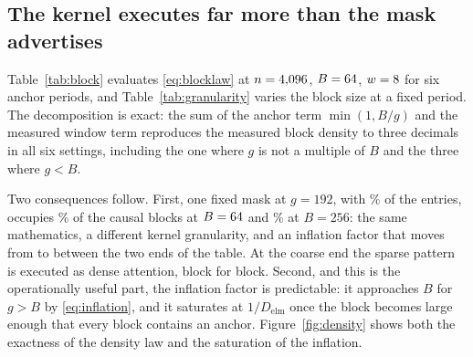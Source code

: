 \subsection{The kernel executes far more than the mask advertises}\label{sec:granularity}

Table~\ref{tab:block} evaluates \eqref{eq:blocklaw} at $n=\AlignN$,
$B=\AlignBlock$, $w=\AlignW$ for six anchor periods, and
Table~\ref{tab:granularity} varies the block size at a fixed period. The
decomposition is exact: the sum of the anchor term $\min(1,B/g)$ and the measured
window term reproduces the measured block density to three decimals in all six
settings, including the one where $g$ is not a multiple of $B$ and the three where
$g<B$.

\begin{table}[t]
\centering

\caption{Granularity law \eqref{eq:blocklaw} at $n=\AlignN$, $B=\AlignBlock$,
$w=\AlignW$. The anchor term is $\min(1,B/g)$; the window term is measured; their
sum reproduces the measured block density exactly. Alignment between $g$ and $B$
does not enter the count; the ratio of executed to element density ranges from
\BlockInflationMin{} to \BlockInflationMax{} across the six periods. Data:
\texttt{s1\_pswa/block\_alignment.json}.}
\label{tab:block}
\end{table}

\begin{table}[t]
\centering

\caption{Inflation of executed density over element density as the block size
grows at fixed period $g=192$, $n=\AlignN$, $w=\AlignW$. ``Block pairs'' is the
fraction of all block pairs the kernel materialises, ``causal blocks'' the same
count over the causal ones, and ``elements'' the fraction of the $n^2$ scores the
mask retains; inflation is the ratio of the first to the third, i.e. the factor
by which the kernel over-computes the mask. The executed density of a block
kernel is not the density of the mask it implements. Data:
\texttt{s1\_pswa/block\_alignment.json}.}
\label{tab:granularity}
\end{table}

Two consequences follow. First, one fixed mask at $g=192$, with
\BlockElemDensPct\% of the entries, occupies \BlockDensCausalAtB\% of the
causal blocks at $B=\AlignBlock$ and \BlockDensCausalSatPct\% at $B=256$: the
same mathematics, a different kernel granularity, and an inflation factor that
moves from \BlockInflationAtRef{} to \BlockInflationGranMax{} between the two
ends of the table. At the coarse end the sparse pattern is executed as dense
attention, block for block. Second, and this is the operationally useful part,
the inflation factor is predictable: it approaches $B$ for $g>B$ by
\eqref{eq:inflation}, and it saturates at $1/D_{\mathrm{elm}}$ once the block
becomes large enough that every block contains an anchor. Figure~\ref{fig:density}
shows both the exactness of the density law and the saturation of the inflation.

